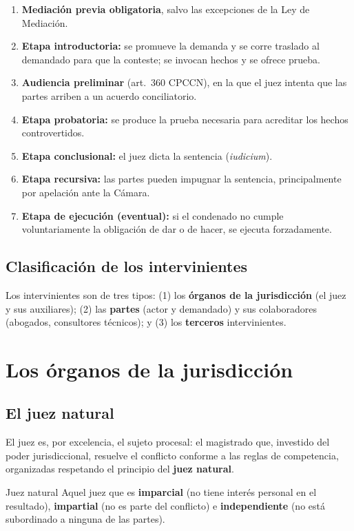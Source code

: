 \documentclass[12pt,oneside]{book}
\begin{document}
\begin{enumerate}
\item \textbf{Mediación previa obligatoria}, salvo las excepciones de la Ley de Mediación.
\item \textbf{Etapa introductoria:} se promueve la demanda y se corre traslado al demandado para que la conteste; se invocan hechos y se ofrece prueba.
\item \textbf{Audiencia preliminar} (art.~360 CPCCN), en la que el juez intenta que las partes arriben a un acuerdo conciliatorio.
\item \textbf{Etapa probatoria:} se produce la prueba necesaria para acreditar los hechos controvertidos.
\item \textbf{Etapa conclusional:} el juez dicta la sentencia (\textit{iudicium}).
\item \textbf{Etapa recursiva:} las partes pueden impugnar la sentencia, principalmente por apelación ante la Cámara.
\item \textbf{Etapa de ejecución (eventual):} si el condenado no cumple voluntariamente la obligación de dar o de hacer, se ejecuta forzadamente.
\end{enumerate}

\subsection{Clasificación de los intervinientes}

Los intervinientes son de tres tipos: (1) los \textbf{órganos de la jurisdicción} (el juez y sus auxiliares); (2) las \textbf{partes} (actor y demandado) y sus colaboradores (abogados, consultores técnicos); y (3) los \textbf{terceros} intervinientes.

\section{Los órganos de la jurisdicción}

\subsection{El juez natural}

El juez es, por excelencia, el sujeto procesal: el magistrado que, investido del poder jurisdiccional, resuelve el conflicto conforme a las reglas de competencia, organizadas respetando el principio del \textbf{juez natural}.

\begin{definicion}{Juez natural}
Aquel juez que es \textbf{imparcial} (no tiene interés personal en el resultado), \textbf{impartial} (no es parte del conflicto) e \textbf{independiente} (no está subordinado a ninguna de las partes).
\end{definicion}
\end{document}
